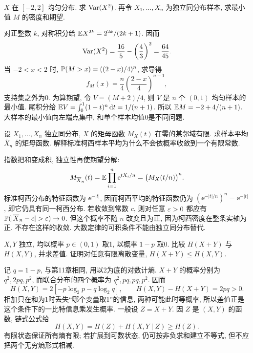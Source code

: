 \begin{exercise}
$X$ 在 $[-2,2]$ 均匀分布. 求 $\operatorname{Var}(X^2)$. 再令 $X_1,\ldots,X_n$ 为独立同分布样本, 求最小值 $M$ 的密度和期望.
\end{exercise}
\begin{solution}
对正整数 $k$, 对称积分给 $\mathbb E X^{2k}=2^{2k}/(2k+1)$. 因而
\[
\operatorname{Var}(X^2)=\frac{16}{5}-\left(\frac43\right)^2=\frac{64}{45}.
\]
当 $-2<x<2$ 时, $\mathbb P(M>x)=((2-x)/4)^n$, 求导得
\[
f_M(x)=\frac n4\left(\frac{2-x}{4}\right)^{n-1},
\]
支持集之外为0. 为算期望, 令 $V=(M+2)/4$, 则 $V$ 是 $n$ 个 $(0,1)$ 均匀样本的最小值. 尾积分给 $\mathbb E V=\int_0^1(1-t)^n\,\mathrm d t=1/(n+1)$. 所以 $\mathbb E M=-2+4/(n+1)$. 大样本的最小值向左端点集中, 和单个样本均值0是不同问题.
\end{solution}

\begin{exercise}
设 $X_1,\ldots,X_n$ 独立同分布, $X$ 的矩母函数 $M_X(t)$ 在零的某邻域有限. 求样本平均 $\overline X_n$ 的矩母函数. 解释标准柯西样本平均为什么不会依概率收敛到一个有限常数.
\end{exercise}
\begin{solution}
指数把和变成积, 独立性再使期望分解:
\[
M_{\overline X_n}(t)=\mathbb E\prod_{i=1}^n\mathrm e^{tX_i/n}
=\bigl(M_X(t/n)\bigr)^n.
\]
标准柯西分布的特征函数为 $\ee^{-|t|}$, 因而柯西平均的特征函数仍为 $(\ee^{-|t|/n})^n=\ee^{-|t|}$, 即它仍具有同一柯西分布. 若收敛到常数 $c$, 则对任意 $\varepsilon>0$ 都应有 $\Prob(|\overline X_n-c|>\eps)\to0$. 但这个概率不随 $n$ 改变且为正, 因为柯西密度在整条实轴为正. 不存在这样的收敛. 大数定律的可积条件不能由独立同分布替代.
\end{solution}

\begin{exercise}
$X,Y$ 独立, 均以概率 $p\in(0,1)$ 取1, 以概率 $1-p$ 取0. 比较 $H(X+Y)$ 与 $H(X,Y)$, 并求差值. 证明对任意有限离散变量, $H(X+Y)\le H(X,Y)$.
\end{exercise}
\begin{solution}
记 $q=1-p$, 与第11章相同, 用以2为底的对数计熵. $X+Y$ 的概率分别为 $q^2,2pq,p^2$, 而联合分布的四个概率为 $q^2,pq,pq,p^2$. 因而
\[
H(X,Y)=2[-p\log_2 p-q\log_2 q],\qquad
H(X,Y)-H(X+Y)=2pq>0.
\]
相加只在和为1时丢失``哪个变量取1''的信息, 两种可能此时等概率, 所以差值正是这个条件下的一比特信息乘发生概率. 一般设 $Z=X+Y$. 因 $Z$ 是 $(X,Y)$ 的函数, 链式公式给
\[
H(X,Y)=H(Z)+H(X,Y\mid Z)\ge H(Z).
\]
有限状态保证所有熵有限; 若扩展到可数状态, 仍可按非负求和建立不等式, 但不应把两个无穷熵形式相减.
\end{solution}

